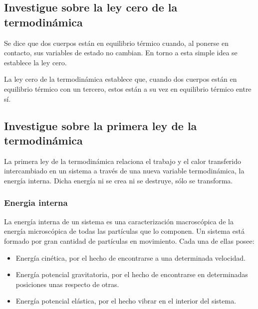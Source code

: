 \documentclass[twocolumn, 12pt]{article}
\begin{document}
\subsection{Investigue sobre la ley cero de la termodinámica~\cite{Fernández_0}}

Se dice que dos cuerpos están en equilibrio térmico cuando,
al ponerse en contacto, sus variables de estado no cambian.
En torno a esta simple idea se establece la ley cero.

La ley cero de la termodinámica establece que, cuando dos
cuerpos están en equilibrio térmico con un tercero, estos
están a su vez en equilibrio térmico entre sí.

\subsection{Investigue sobre la primera ley de la termodinámica~\cite{Fernández_1}}

La primera ley de la termodinámica relaciona el trabajo y
el calor transferido intercambiado en un sistema a través
de una nueva variable termodinámica, la energía interna.
Dicha energía ni se crea ni se destruye, sólo se
transforma.

\subsubsection{Energia interna~\cite{Fernández_1}}

La energía interna de un sistema es una caracterización
macroscópica de la energía microscópica de todas las
partículas que lo componen. Un sistema está formado por
gran cantidad de partículas en movimiento. Cada una de
ellas posee:

\begin{itemize}[label=$\triangleright$]
    \item Energía cinética, por el hecho de encontrarse a una
          determinada velocidad.

    \item Energía potencial gravitatoria, por el hecho de encontrarse
          en determinadas posiciones unas respecto de otras.

    \item Energía potencial elástica, por el hecho vibrar en el
          interior del sistema.
\end{itemize}
\end{document}
